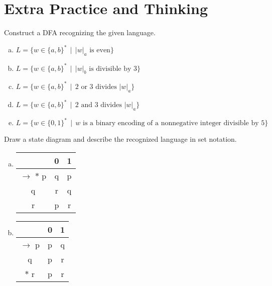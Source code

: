 \documentclass[a4paper,12pt]{amsart}
\begin{document}
\section*{Extra Practice and Thinking}


\medskip\begin{problem}
    
    Construct a DFA recognizing the given language.

    \medskip
    
    \begin{enumerate}[(a)]\setlength\itemsep{6pt}
        \item $L=\{w\in\{a,b\}^* \,\mid\, |w|_a \text{ is even}\}$
        \item $L=\{w\in\{a,b\}^* \,\mid\, |w|_b \text{ is divisible by 3}\}$
        \item $L=\{w\in\{a,b\}^* \,\mid\, \text{2 or 3 divides }|w|_a\}$
        \item $L=\{w\in\{a,b\}^* \,\mid\, \text{2 and 3 divides }|w|_a\}$
        \item $L=\{w\in\{0,1\}^* \,\mid\, w\text{ is a binary encoding of a nonnegative integer divisible by 5}\}$       
    \end{enumerate}

\end{problem}


\medskip\begin{problem}

    Draw a state diagram and describe the recognized language in set notation.

    \begin{multicols}{2}
    
        \begin{enumerate}[(a)]    
            \item \begin{tabular}{ c | c c }
            & 0 & 1 \\   \hline
            $\to$ $\ast$ p & q & p \\  
            q & r & q\\
            r & p & r
            \end{tabular}
    
        \columnbreak

            \item \begin{tabular}{ c | c c }
            & 0 & 1 \\   \hline
            $\to$ p & p & q \\  
            q & p & r\\
            $\ast$ r & p & r
            \end{tabular}

        \end{enumerate}

    \end{multicols}

\end{problem}
\end{document}

